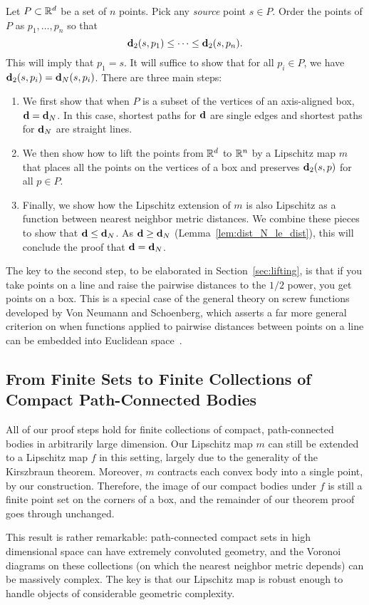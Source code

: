 \label{sec:the_proof}

  Let $P\subset \mathbb{R}^d$ be a set of $n$ points.
  Pick any \emph{source} point $s\in P$.
  Order the points of $P$ as $p_1,\ldots ,p_n$ so that
  \[
    \mathbf{d}_2(s,p_1) \le \cdots \le \mathbf{d}_2(s, p_n).
  \]
  This will imply that $p_1 = s$.
  It will suffice to show that for all $p_i\in P$, we have $\mathbf{d}_2(s,p_i) = \mathbf{d}_N(s,p_i)$.
  There are three main steps:
  \begin{enumerate}
    \item We first show that when $P$ is a subset of the vertices of an axis-aligned box, $\mathbf{d} = \mathbf{d}_N$.  In this case, shortest paths for $\mathbf{d}$ are single edges and shortest paths for $\mathbf{d}_N$ are straight lines.
    \item We then show how to lift the points from $\mathbb{R}^d$ to $\mathbb{R}^n$ by a Lipschitz map $m$ that places all the points on the vertices of a box and preserves $\mathbf{d}_2(s,p)$ for all $p\in P$.
    \item Finally, we show how the Lipschitz extension of $m$ is also Lipschitz as a function between nearest neighbor metric distances.  We combine these pieces to show that $\mathbf{d} \le \mathbf{d}_N$.  As $\mathbf{d} \ge \mathbf{d}_N$ (Lemma~\ref{lem:dist_N_le_dist}), this will conclude the proof that $\mathbf{d} = \mathbf{d}_N$.
  \end{enumerate}
The key to the second step, to be elaborated in Section~\ref{sec:lifting},
is that if you take points on a line and raise the pairwise distances to
the $1/2$ power, you get points on a box. This is a special case of the
general theory on screw functions developed by Von Neumann and Schoenberg,
which asserts a far more general criterion on when functions applied to
pairwise distances between points on a line can be embedded into Euclidean
space~\cite{VonNeumann41}.
  
  
  
\subsection{From Finite Sets to Finite Collections of Compact Path-Connected Bodies}
\label{sec:bodies}
All of our proof steps hold for finite collections of compact,
path-connected bodies in arbitrarily large dimension. Our Lipschitz map $m$ can
still be extended to a Lipschitz map $f$ in this setting, largely due to the
generality of the Kirszbraun theorem. Moreover, $m$ contracts each convex
body into a single point, by our construction. Therefore, the image of our
compact bodies under $f$ is still a finite point set on the corners of a
box, and the remainder of our theorem proof goes through unchanged.

This result is rather remarkable: path-connected compact sets in high
dimensional space can have extremely convoluted geometry, and the Voronoi diagrams
on these collections (on which the nearest neighbor metric depends) can be
massively complex.  The key is that our Lipschitz map is robust enough to
handle objects of considerable geometric complexity.
  
  
